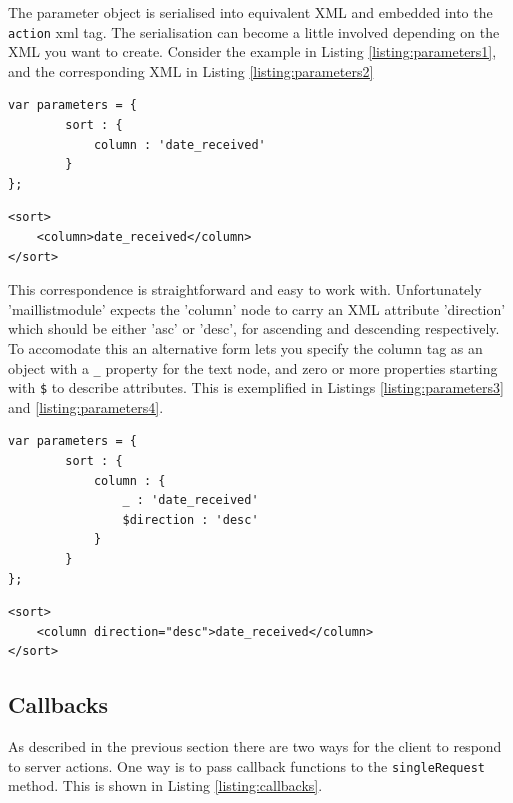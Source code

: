 The parameter object is serialised into equivalent XML and embedded into the {\tt action} xml tag. The 
serialisation can become a little involved depending on the XML you want to create. Consider the example
in Listing \ref{listing:parameters1}, and the corresponding XML in Listing \ref{listing:parameters2}

\begin{lstlisting}[caption={Parameter serialisation, JavaScript}, label=listing:parameters1]
var parameters = {
		sort : {
			column : 'date_received'
		}
};
\end{lstlisting}

\begin{lstlisting}[caption={Parameter serialisation, XML}, label=listing:parameters2]
<sort>
	<column>date_received</column>
</sort>
\end{lstlisting}

This correspondence is straightforward and easy to work with. Unfortunately 'maillistmodule' expects the
'column' node to carry an XML attribute 'direction' which should be either 'asc' or 'desc', for ascending and
descending respectively. To accomodate this an alternative form lets you specify the column tag as an
object with a {\tt \_} property for the text node, and zero or more properties starting with {\tt \$} to
describe attributes. This is exemplified in Listings \ref{listing:parameters3} and \ref{listing:parameters4}.

\begin{lstlisting}[caption={Parameter serialisation, JavaScript}, label=listing:parameters3]
var parameters = {
		sort : {
			column : {
				_ : 'date_received'
				$direction : 'desc'				
			}
		}
};
\end{lstlisting}

\begin{lstlisting}[caption={Parameter serialisation, XML}, label=listing:parameters4]
<sort>
	<column direction="desc">date_received</column>
</sort>
\end{lstlisting}

\subsection{Callbacks}

As described in the previous section there are two ways for the client to respond to server actions.
One way is to pass callback functions to the {\tt singleRequest} method. This is shown in Listing 
\ref{listing:callbacks}.

